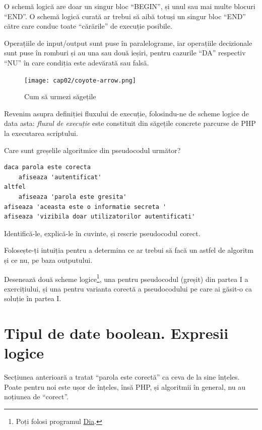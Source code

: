 O schemă logică are doar un singur bloc ``BEGIN'', și unul
sau mai multe blocuri ``END''. O schemă logică curată
ar trebui să aibă totuși un singur bloc ``END''
către care conduc toate ``cărările'' de execuție posibile.

Operațiile de input/output sunt puse în paralelograme,
iar operațiile decizionale sunt puse în romburi și au
una sau două ieșiri, pentru cazurile ``DA'' respectiv ``NU''
în care condiția este adevărată sau falsă.

\begin{figure}[ht!]
  \centering
    \texttt{[image: cap02/coyote-arrow.png]}
  \caption{Cum să urmezi săgețile}
  \label{fig:coyote arrow}
\end{figure}

Revenim asupra definiției fluxului de execuție, folosindu-ne de scheme logice de data asta:
\textit{fluxul de execuție} este constituit din săgețile concrete parcurse de PHP
la executarea scriptului.

\begin{Exercise}[difficulty=2,title={Găsește eroarea de logică}]
\ExePart
Care sunt greșelile algoritmice din pseudocodul următor?

\begin{lstlisting}[language=pseudocod]
daca parola este corecta
	afiseaza 'autentificat'
altfel
	afiseaza 'parola este gresita'
afiseaza 'aceasta este o informatie secreta '
afiseaza 'vizibila doar utilizatorilor autentificati'
\end{lstlisting}

Identifică-le, explică-le în cuvinte, și rescrie pseudocodul corect.

Folosește-ți intuiția pentru a determina ce ar trebui
să facă un astfel de algoritm și ce nu, pe baza outputului.

\ExePart
Desenează două scheme logice\footnote{Poți folosi programul
\href{http://projects.gnome.org/dia/}{Dia}.}, una pentru pseudocodul (greșit)
din partea I a exercițiului, și una pentru varianta corectă
a pseudocodului pe care ai găsit-o ca soluție în partea I.
\end{Exercise}


\section{Tipul de date boolean. Expresii logice}
\label{sec:tipul de date boolean. Expresii logice}

Secțiunea anterioară a tratat ``parola este corectă'' ca ceva
de la sine înțeles. Poate pentru noi este ușor de înțeles,
însă PHP, și algoritmii în general, nu au noțiunea de ``corect''.


